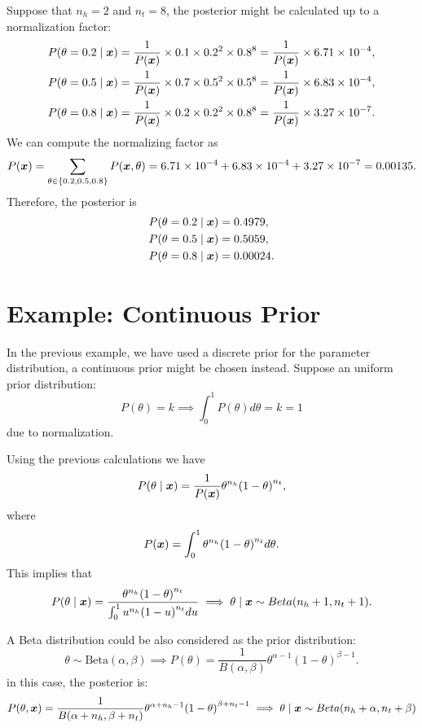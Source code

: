 Suppose that \(n_h = 2\) and \(n_t = 8\), the posterior might be calculated up to a normalization factor:
\[
\begin{aligned}
  P(\theta = 0.2  \mid  \bm{x}) &= \frac{1}{P(\bm{x})}\times 0.1 \times 0.2^{2}
  \times 0.8^{8} = \frac{1}{P(\bm{x})} \times 6.71\times10^{-4}, \\
   P(\theta = 0.5  \mid  \bm{x}) &= \frac{1}{P(\bm{x})}\times 0.7 \times 0.5^{2}
   \times 0.5^{8} = \frac{1}{P(\bm{x})} \times 6.83\times10^{-4},\\
    P(\theta = 0.8  \mid  \bm{x}) &= \frac{1}{P(\bm{x})}\times 0.2 \times 0.2^{2}
  \times 0.8^{8} = \frac{1}{P(\bm{x})} \times 3.27\times10^{-7}.
\end{aligned}
\]
We can compute the normalizing factor as
\[
   P(\bm{x}) = \sum_{\theta \in \{0.2, 0.5, 0.8\}} P(\bm{x}, \theta) =   6.71\times10^{-4} +   6.83\times10^{-4} +
   3.27\times10^{-7} = 0.00135.
 \]
Therefore, the posterior is
\[
\begin{aligned}
  P(\theta = 0.2  \mid  \bm{x}) &= 0.4979,\\
  P(\theta = 0.5  \mid  \bm{x}) &= 0.5059,\\
  P(\theta = 0.8  \mid  \bm{x}) &= 0.00024.
\end{aligned}
\]

\section{Example: Continuous Prior}

In the previous example, we have used a discrete prior for the parameter distribution, a continuous prior might be chosen instead. Suppose an uniform prior distribution:
\[
P(\theta) = k \implies \int_0^1 P(\theta) d\theta = k = 1
\]
due to normalization.

Using the previous calculations we have
\[
  P(\theta \mid  \bm{x}) = \frac{1}{P(\bm{x})} \theta^{n_h}{(1-\theta)}^{n_t},
\]
where
\[
  P(\bm{x}) = \int_0^1 \theta^{n_h}{(1-\theta)}^{n_t} d\theta.
\]
This implies that
\[
  P(\theta \mid \bm{x}) = \frac{\theta^{n_h}{(1-\theta)}^{n_t} }{ \int_0^1 u^{n_h}{(1-u)}^{n_t} du} \implies \theta \mid \bm{x} \sim Beta(n_h + 1, n_t + 1).
\]

A Beta distribution could be also considered as the prior distribution:
\[
  \theta \sim \text{Beta}(\alpha, \beta) \implies P(\theta) = \frac{1}{B(\alpha, \beta)}\theta^{\alpha - 1}{(1 - \theta)}^{\beta - 1}.
\]
in this case, the posterior is:
\[
  P(\theta, \bm{x}) = \frac{1}{B(\alpha + n_h, \beta + n_t)}\theta^{\alpha
    + n_h - 1}{(1 - \theta)}^{\beta + n_t - 1} \implies \theta \mid \bm{x} \sim Beta(n_h + \alpha, n_t + \beta)
\]

